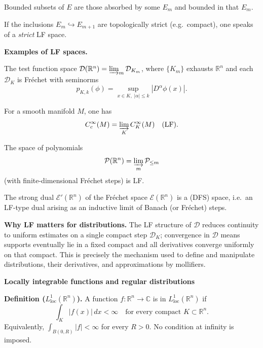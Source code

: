 \begin{problem}[CP-III-0024]
\smallskip

Bounded subsets of $E$ are those absorbed by some $E_m$ and bounded in that $E_m$.

\smallskip

If the inclusions $E_m \hookrightarrow E_{m+1}$ are topologically strict (e.g.\ compact),
one speaks of a \emph{strict} LF space.

\bigskip

\par\smallskip\noindent\textbf{Examples of LF spaces.}\quad

\smallskip

The test function space $\mathcal D(\mathbb R^n)
= \varinjlim_m \mathcal D_{K_m}$, where $\{K_m\}$ exhausts $\mathbb R^n$
and each $\mathcal D_{K}$ is Fr\'echet with seminorms
\[
p_{K,k}(\phi)=\sup_{x\in K,\;|\alpha|\le k} |D^\alpha \phi(x)|.
\]

\smallskip

For a smooth manifold $M$, one has
\[
C_c^\infty(M)=\varinjlim_{K} C^\infty_{K}(M) \quad \text{(LF).}
\]

\smallskip

The space of polynomials
\[
\mathcal P(\mathbb R^n)=\varinjlim_m \mathcal P_{\le m}
\]
(with finite-dimensional Fr\'echet steps) is LF.

\smallskip

The strong dual $\mathcal E'(\mathbb R^n)$ of the Fr\'echet space $\mathcal E(\mathbb R^n)$
is a (DFS) space, i.e.\ an LF-type dual arising as an inductive limit of Banach (or Fr\'echet) steps.

\medskip


\par\smallskip\noindent\textbf{Why LF matters for distributions.}\quad
The LF structure of $\mathcal D$ reduces continuity to uniform estimates on a single compact step $\mathcal D_K$;
convergence in $\mathcal D$ means supports eventually lie in a fixed compact and all derivatives converge uniformly on that compact.
This is precisely the mechanism used to define and manipulate distributions, their derivatives, and approximations by mollifiers.

\par\medskip\noindent\textbf{Locally integrable functions and regular distributions}\quad

\par\smallskip\noindent\textbf{Definition ($L^1_{\mathrm{loc}}(\mathbb R^n)$).}\quad
A function $f:\mathbb R^n\to\mathbb C$ is in $L^1_{\mathrm{loc}}(\mathbb R^n)$ if
\[
\int_K |f(x)|\,dx<\infty \quad \text{for every compact } K\subset\mathbb R^n .
\]
Equivalently, $\int_{B(0,R)} |f|<\infty$ for every $R>0$. No condition at infinity is imposed.


\end{problem}
